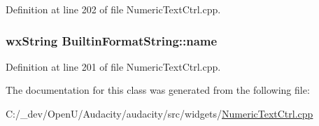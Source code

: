Definition at line 202 of file Numeric\+Text\+Ctrl.\+cpp.

\subsubsection[{\texorpdfstring{name}{name}}]{\setlength{\rightskip}{0pt plus 5cm}wx\+String Builtin\+Format\+String\+::name}\hypertarget{struct_builtin_format_string_a7166ff344a8c117c84e12e97dd86b3c1}{}\label{struct_builtin_format_string_a7166ff344a8c117c84e12e97dd86b3c1}


Definition at line 201 of file Numeric\+Text\+Ctrl.\+cpp.



The documentation for this class was generated from the following file\+:\begin{DoxyCompactItemize}
\item 
C\+:/\+\_\+dev/\+Open\+U/\+Audacity/audacity/src/widgets/\hyperlink{_numeric_text_ctrl_8cpp}{Numeric\+Text\+Ctrl.\+cpp}\end{DoxyCompactItemize}
